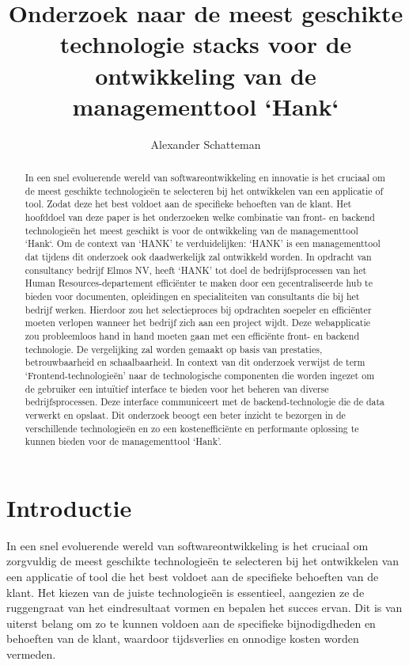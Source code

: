 \documentclass{hogent-article}
\title{Onderzoek naar de meest geschikte technologie stacks voor de ontwikkeling van de managementtool `Hank`}
\author{Alexander Schatteman}
\begin{document}
\begin{abstract}
    In een snel e\-vo\-lu\-erende wereld van softwareontwikkeling en innovatie is het cruciaal om de meest geschikte technologieën te se\-lec\-teren bij het ontwikkelen van een applicatie of tool. Zodat deze het best voldoet aan de specifieke behoeften van de klant.
    \bigbreak
    Het hoofddoel van deze paper is het onderzoeken welke combinatie van front- en backend technologieën het meest geschikt is voor de ontwikkeling van de managementtool `Hank`.
    \bigbreak
    Om de context van `HANK' te verduidelijken: `HANK' is een managementtool dat tijdens dit onderzoek ook daadwerkelijk zal ontwikkeld worden. In opdracht van consultancy bedrijf Elmos NV, heeft `HANK' tot doel de bedrijfsprocessen van het Human Resources-departement efficiënter te maken door een gecentraliseerde hub te bieden voor documenten, opleidingen en specialiteiten van consultants die bij het bedrijf werken. Hierdoor zou het selectieproces bij opdrachten soepeler en efficiënter moeten verlopen wanneer het bedrijf zich aan een project wijdt. Deze webapplicatie zou probleemloos hand in hand moeten gaan met een efficiënte front- en backend technologie. 
    \bigbreak 
    De vergelijking zal worden gemaakt op basis van prestaties, betrouwbaarheid en schaalbaarheid. In context van dit onderzoek verwijst de term `Frontend-technologieën' naar de technologische componenten die worden ingezet om de gebruiker een intuïtief interface te bieden voor het beheren van diverse bedrijfsprocessen. Deze interface communiceert met de backend-technologie die de data verwerkt en opslaat. 
    \bigbreak
    Dit onderzoek beoogt een beter inzicht te bezorgen in de verschillende technologieën en zo een kostenefficiënte en performante oplossing te kunnen bieden voor de managementtool `Hank'.
\end{abstract}

\tableofcontents
\section{Introductie}%
\label{sec:introductie}
  In een snel evoluerende wereld van softwareontwikkeling is het cruciaal om zorgvuldig de meest geschikte technologieën te selecteren bij het ontwikkelen van een applicatie of tool die het best voldoet aan de specifieke behoeften van de klant.
  Het kiezen van de juiste technologieën is essentieel, aangezien ze de ruggengraat van het eindresultaat vormen en bepalen het succes ervan. Dit is van uiterst belang om zo te kunnen voldoen aan de specifieke bijnodigdheden en behoeften van de klant, waardoor tijdsverlies en onnodige kosten worden vermeden. 
  
\end{document}
